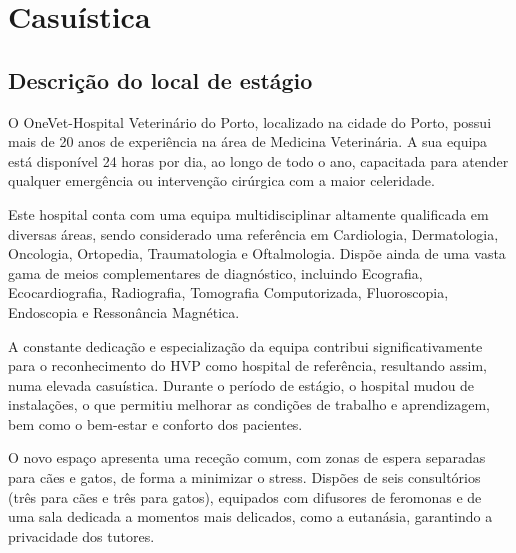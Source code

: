 
\chapter{Casuística}
\label{chapter:Casuistica}



\section{Descrição do local de estágio}


O OneVet-Hospital Veterinário do Porto, localizado na cidade do Porto, possui mais de 20 anos de experiência na área de Medicina Veterinária. A sua equipa está disponível 24 horas por dia, ao longo de todo o ano, capacitada para atender qualquer emergência ou intervenção cirúrgica com a maior celeridade. 

Este hospital conta com uma equipa multidisciplinar altamente qualificada em diversas áreas, sendo considerado uma referência em Cardiologia, Dermatologia, Oncologia, Ortopedia, Traumatologia e Oftalmologia. Dispõe ainda de uma vasta gama de meios complementares de diagnóstico, incluindo Ecografia, Ecocardiografia, Radiografia, Tomografia Computorizada, Fluoroscopia, Endoscopia e Ressonância Magnética.

A constante dedicação e especialização da equipa contribui significativamente para o reconhecimento do HVP como hospital de referência, resultando assim, numa elevada casuística.
Durante o período de estágio, o hospital mudou de instalações, o que permitiu melhorar as condições de trabalho e aprendizagem, bem como o bem-estar e conforto dos pacientes. 

O novo espaço apresenta uma receção comum, com zonas de espera separadas para cães e gatos, de forma a minimizar o stress. Dispões de seis consultórios (três para cães e três para gatos), equipados com difusores de feromonas e de uma sala dedicada a momentos mais delicados, como a eutanásia, garantindo a privacidade dos tutores.

